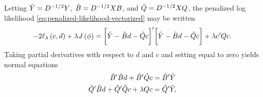 %
%
Letting $\tilde{Y} = D^{-1/2} Y$, $\tilde{B} = D^{-1/2} X B $, and $\tilde{Q} = D^{-1/2} X Q$, the penalized log likelihood \ref{eq:penalized-likelihood-vectorized} may be written
\begin{equation}\label{eq:penalized-loglik-tilde-vectorized}
-2\ell_\lambda \left(c, d \right) + \lambda J\left( \phi \right) = \bigg[ \tilde{Y} - \tilde{B} d - \tilde{Q} c\bigg]'\bigg[ \tilde{Y} - \tilde{B} d - \tilde{Q} c\bigg] + \lambda c'Qc.
\end{equation}
\noindent
Taking partial derivatives with respect to $d$ and $c$ and setting equal to zero yields normal equations 
\begin{align}
\begin{split}
\tilde{B}'\tilde{B} d + \tilde{B}'\tilde{Q} c &= \tilde{B}' \tilde{Y} \\
\tilde{Q}'\tilde{B} d + \tilde{Q}'\tilde{Q} c + \lambda Q c &= \tilde{Q}' \tilde{Y}, 
\end{split}
\end{align}
